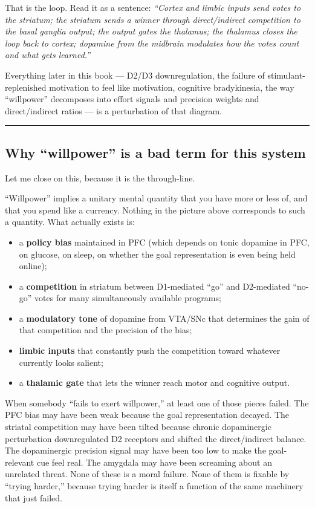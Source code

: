 That is the loop. Read it as a sentence: \emph{``Cortex and limbic inputs send votes to the striatum; the striatum sends a winner through direct/indirect competition to the basal ganglia output; the output gates the thalamus; the thalamus closes the loop back to cortex; dopamine from the midbrain modulates how the votes count and what gets learned.''}

Everything later in this book --- D2/D3 downregulation, the failure of stimulant-replenished motivation to feel like motivation, cognitive bradykinesia, the way ``willpower'' decomposes into effort signals and precision weights and direct/indirect ratios --- is a perturbation of that diagram.

\begin{center}\rule{0.5\linewidth}{0.5pt}\end{center}

\subsection{Why ``willpower'' is a bad term for this system}\label{06_neurology_101-why-willpower-is-a-bad-term-for-this-system}

Let me close on this, because it is the through-line.

``Willpower'' implies a unitary mental quantity that you have more or less of, and that you spend like a currency. Nothing in the picture above corresponds to such a quantity. What actually exists is:

\begin{itemize}
\tightlist
\item
  a \textbf{policy bias} maintained in PFC (which depends on tonic dopamine in PFC, on glucose, on sleep, on whether the goal representation is even being held online);
\item
  a \textbf{competition} in striatum between D1-mediated ``go'' and D2-mediated ``no-go'' votes for many simultaneously available programs;
\item
  a \textbf{modulatory tone} of dopamine from VTA/SNc that determines the gain of that competition and the precision of the bias;
\item
  \textbf{limbic inputs} that constantly push the competition toward whatever currently looks salient;
\item
  a \textbf{thalamic gate} that lets the winner reach motor and cognitive output.
\end{itemize}

When somebody ``fails to exert willpower,'' at least one of those pieces failed. The PFC bias may have been weak because the goal representation decayed. The striatal competition may have been tilted because chronic dopaminergic perturbation downregulated D2 receptors and shifted the direct/indirect balance. The dopaminergic precision signal may have been too low to make the goal-relevant cue feel real. The amygdala may have been screaming about an unrelated threat. None of these is a moral failure. None of them is fixable by ``trying harder,'' because trying harder is itself a function of the same machinery that just failed.

